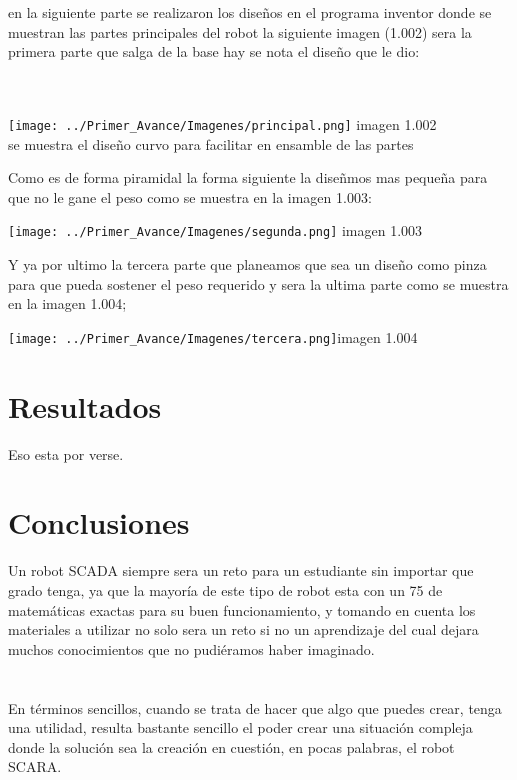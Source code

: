 \documentclass[10pt,a4paper]{article}
\begin{document}
{\Large en la siguiente parte se realizaron los diseños en el programa inventor donde se muestran las partes principales del robot la siguiente imagen (1.002) sera la primera parte que salga de la base hay se nota el diseño que le dio:}\\ \\ \\
\begin{center}
 \texttt{[image: ../Primer\_Avance/Imagenes/principal.png]} {imagen 1.002  \\  se muestra el diseño curvo para facilitar en ensamble de las partes} \\

\end{center}
 {\large Como es de forma piramidal la forma siguiente la diseñmos mas pequeña para que no le gane el peso como se muestra en la imagen 1.003:
 \begin{center}
 \texttt{[image: ../Primer\_Avance/Imagenes/segunda.png]} imagen 1.003 \\ 
 \end{center}
 \large Y ya por ultimo la tercera parte que planeamos que sea un diseño como pinza para que pueda sostener el peso requerido y sera la ultima parte como se muestra en la imagen 1.004;
 \begin{center}
 \texttt{[image: ../Primer\_Avance/Imagenes/tercera.png]}imagen 1.004
 \end{center}
 
\section{{\Huge Resultados }}

{\Large Eso esta por verse. }
\section{{\Huge Conclusiones }}
{\large Un robot SCADA siempre sera un reto para un estudiante sin importar que grado tenga, ya que  la mayoría de este tipo de robot esta con un 75 de matemáticas exactas para su buen funcionamiento, y tomando en cuenta los materiales a utilizar no solo sera un reto si no un aprendizaje del cual dejara muchos conocimientos que no pudiéramos haber imaginado.\\ \\ \\

En términos sencillos, cuando se trata de hacer que algo que puedes crear, tenga una utilidad, resulta bastante sencillo el poder crear una situación compleja donde la solución sea la creación en cuestión, en pocas palabras, el robot SCARA.\\ 
	
}}
\end{document}
